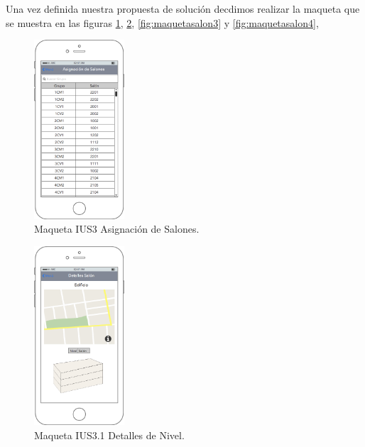 Una vez definida nuestra propuesta de solución decdimos realizar la maqueta que se muestra en las figuras \ref{fig:maquetasalon1}, \ref{fig:maquetasalon2}, \ref{fig:maquetasalon3} y \ref{fig:maquetasalon4},   
 \begin{figure}[h!]
	\begin{center}
		\includegraphics[width=0.3\textwidth]{images/maqueta/UIS3AsignaciondeSalones.png}
		\caption{Maqueta IUS3 Asignación de Salones.}
		\label{fig:maquetasalon1}
	\end{center}
\end{figure}
 \begin{figure}[h!]
	\begin{center}
		\includegraphics[width=0.3\textwidth]{images/maqueta/UIS31DetallesSalon.png}
		\caption{Maqueta IUS3.1 Detalles de Nivel.}
		\label{fig:maquetasalon2}
	\end{center}
\end{figure}
